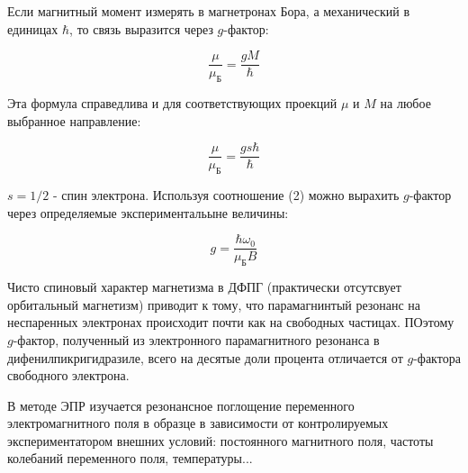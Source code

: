 \documentclass[a4paper]{article}
\begin{document}
Если магнитный момент измерять в магнетронах Бора, а механический в единицах $\hbar$, то связь выразится через $g$-фактор:

\begin{equation}
    \frac{\mu}{\mu_Б} = \frac{g M}{\hbar}
\end{equation}

Эта формула справедлива и для соответствующих проекций $\mu$ и $M$ на любое выбранное направление:

\begin{equation}
    \frac{\mu}{\mu_Б} = \frac{g s \hbar}{\hbar}
\end{equation}

$s = 1/2$ - спин электрона. Используя соотношение (2) можно вырахить $g$-фактор через определяемые экспериментальыне величины:

\begin{equation}
    g = \frac{\hbar \omega_0}{\mu_Б B}
\end{equation}

Чисто спиновый характер магнетизма в ДФПГ (практически отсутсвует орбитальный магнетизм) приводит к тому, что парамагнинтый резонанс на неспаренных 
электронах происходит почти как на свободных частицах. ПОэтому $g$-фактор, полученный из электронного 
парамагнитного резонанса в дифенилпикригидразиле, всего на десятые доли процента отличается от $g$-фактора свободного электрона. \par

В методе ЭПР изучается резонансное поглощение переменного электромагнитного поля в образце в зависимости от контролируемых 
экспериментатором внешних условий: постоянного магнитного поля, частоты колебаний переменного поля, температуры... 
\end{document}
